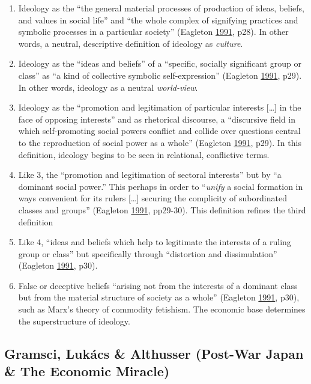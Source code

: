 \documentclass[10pt,british,A4paper,,openany]{memoir}
\providecommand{\tightlist}{%
  \setlength{\itemsep}{0pt}\setlength{\parskip}{0pt}}
\begin{document}
\begin{enumerate}
\def\labelenumi{\arabic{enumi}.}
\tightlist
\item
  Ideology as the ``the general material processes of production of
  ideas, beliefs, and values in social life'' and ``the whole complex of
  signifying practices and symbolic processes in a particular society''
  (Eagleton \protect\hyperlink{ref-eagleton_ideology:_1991}{1991}, p28).
  In other words, a neutral, descriptive definition of ideology as
  \emph{culture}.
\item
  Ideology as the ``ideas and beliefs'' of a ``specific, socially
  significant group or class'' as ``a kind of collective symbolic
  self-expression'' (Eagleton
  \protect\hyperlink{ref-eagleton_ideology:_1991}{1991}, p29). In other
  words, ideology as a neutral \emph{world-view}.
\item
  Ideology as the ``promotion and legitimation of particular interests
  {[}\ldots{}{]} in the face of opposing interests'' and as rhetorical
  discourse, a ``discursive field in which self-promoting social powers
  conflict and collide over questions central to the reproduction of
  social power as a whole'' (Eagleton
  \protect\hyperlink{ref-eagleton_ideology:_1991}{1991}, p29). In this
  definition, ideology begins to be seen in relational, conflictive
  terms.
\item
  Like 3, the ``promotion and legitimation of sectoral interests'' but
  by ``a dominant social power.'' This perhaps in order to
  ``\emph{unify} a social formation in ways convenient for its rulers
  {[}\ldots{}{]} securing the complicity of subordinated classes and
  groups'' (Eagleton
  \protect\hyperlink{ref-eagleton_ideology:_1991}{1991}, pp29-30). This
  definition refines the third definition
\item
  Like 4, ``ideas and beliefs which help to legitimate the interests of
  a ruling group or class'' but specifically through ``distortion and
  dissimulation'' (Eagleton
  \protect\hyperlink{ref-eagleton_ideology:_1991}{1991}, p30).
\item
  False or deceptive beliefs ``arising not from the interests of a
  dominant class but from the material structure of society as a whole''
  (Eagleton \protect\hyperlink{ref-eagleton_ideology:_1991}{1991}, p30),
  such as Marx's theory of commodity fetishism. The economic base
  determines the superstructure of ideology.
\end{enumerate}

\subsection{Gramsci, Lukács \& Althusser (Post-War Japan \& The Economic
Miracle)}\label{gramsci-lukuxe1cs-althusser-post-war-japan-the-economic-miracle}
\end{document}
